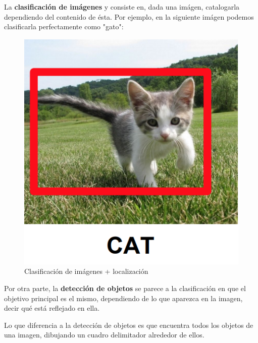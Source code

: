\documentclass[11pt,a4paper]{article}
\begin{document}
La \textbf{clasificación de imágenes} y consiste en, dada una imágen, catalogarla dependiendo del contenido de ésta. Por ejemplo, en la siguiente
imágen podemos clasificarla perfectamente como "gato":
\begin{figure}[H]
\centering
\includegraphics[scale=0.5]{img/classifier.png}
\caption{Clasificación de imágenes + localización}
\end{figure}

Por otra parte, la \textbf{detección de objetos} se parece a la clasificación en que el objetivo principal es el mismo, dependiendo de lo que aparezca en la
imagen, decir qué está reflejado en ella.

Lo que diferencia a la detección de objetos es que encuentra todos los objetos de una imagen, dibujando un cuadro delimitador alrededor de ellos.
\end{document}
